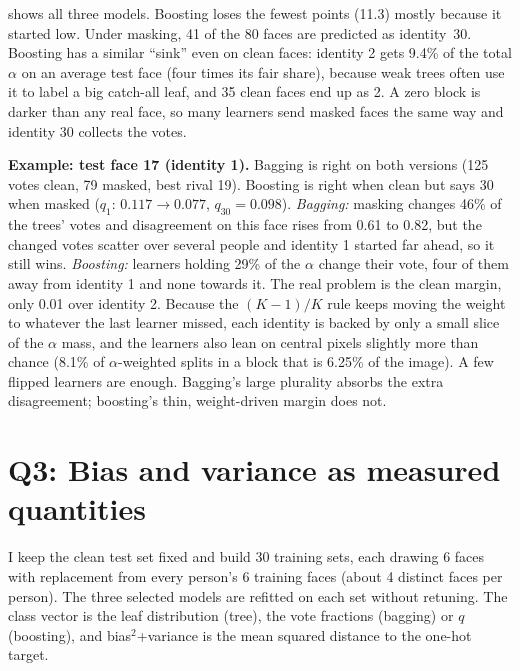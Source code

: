 \documentclass[10pt,twocolumn,letterpaper]{article}
\begin{document}
 shows all three models. Boosting loses the fewest points
(11.3) mostly because it started low. Under masking, 41 of the 80 faces are
predicted as identity~30. Boosting has a similar ``sink'' even on clean faces:
identity 2 gets 9.4\% of the total $\alpha$ on an average test face (four
times its fair share), because weak trees often use it to label a big
catch-all leaf, and 35 clean faces end up as 2. A zero block is darker than any
real face, so many learners send masked faces the same way and identity 30
collects the votes.

\textbf{Example: test face 17 (identity 1).} Bagging is right on both versions
(125 votes clean, 79 masked, best rival 19). Boosting is right when clean but
says 30 when masked ($q_1$: $0.117\to0.077$, $q_{30}=0.098$). \emph{Bagging:}
masking changes 46\% of the trees' votes and disagreement on this face rises
from 0.61 to 0.82, but the changed votes scatter over several people and
identity 1 started far ahead, so it still wins. \emph{Boosting:} learners
holding 29\% of the $\alpha$ change their vote, four of them away from identity
1 and none towards it. The real problem is the clean margin, only 0.01 over
identity 2. Because the $(K-1)/K$ rule keeps moving the weight to whatever the
last learner missed, each identity is backed by only a small slice of the
$\alpha$ mass, and the learners also lean on central pixels slightly more than
chance (8.1\% of $\alpha$-weighted splits in a block that is 6.25\% of the
image). A few flipped learners are enough. Bagging's large plurality absorbs
the extra disagreement; boosting's thin, weight-driven margin does not.

\section{Q3: Bias and variance as measured quantities}
I keep the clean test set fixed and build 30 training sets, each drawing 6
faces with replacement from every person's 6 training faces (about 4 distinct
faces per person). The three selected models are refitted on each set without
retuning. The class vector is the leaf distribution (tree), the vote fractions
(bagging) or $q$ (boosting), and bias$^2$+variance is the mean squared distance
to the one-hot target.
\end{document}
